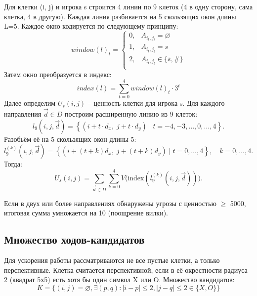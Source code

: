 \documentclass[14pt]{extreport}
\begin{document}
Для клетки (i, j) и игрока s строится 4 линии по 9 клеток (4 в одну сторону, сама клетка, 4 в другую). Каждая линия разбивается на 5 скользящих окон длины L=5. Каждое окно кодируется по следующему принципу:
\[ window(l)_t = \begin{cases}
0, & A_{i_t, j_t} = \varnothing \\
1, & A_{i_t, j_t} = s \\
2, & A_{i_t, j_t} \in \{ \bar{s}, \# \} \\
\end{cases} \]
Затем окно преобразуется в индекс:
\[ index(l) = \sum_{t=0}^{4}window(l)_t \cdot 3^t \]
Далее определим $U_s(i, j)$ -- ценность клетки для игрока s.
Для каждого направления \( \vec{d} \in D \) построим расширенную линию из 9 клеток:
\[ l_9(i, j, \vec{d}) = \left\{ (i + t \cdot d_x, \; j + t \cdot d_y) \mid t = -4, -3, \dots, 0, \dots, 4 \right\}. \]
Разобьём её на 5 скользящих окон длины 5:
\[ l_9^{(k)}(i, j, \vec{d}) = \left\{ (i + (t + k)d_x, \; j + (t + k)d_y) \mid t = 0, \dots, 4 \right\}, \quad k = 0, \dots, 4. \]
Тогда:
\[ U_s(i, j) = \sum_{\vec{d} \in D} \sum_{k=0}^{4} V\bigl( \text{index}(l_9^{(k)}(i, j, \vec{d})) \bigr). \]

Если в двух или более направлениях обнаружены угрозы с ценностью $\geq$ 5000, итоговая сумма умножается на 10 (поощрение вилки).

\subsection{Множество ходов-кандидатов}
Для ускорения работы рассматриваются не все пустые клетки, а только перспективные. Клетка считается перспективной, если в её окрестности радиуса 2 (квадрат 5х5) есть хотя бы один символ X или O. Множество кандидатов:
\[ K = \{(i, j) = \varnothing, \exists (p, q) : |i - p| \leq 2, |j - q| \leq 2 \in \{ X, O \} \} \]
\end{document}
